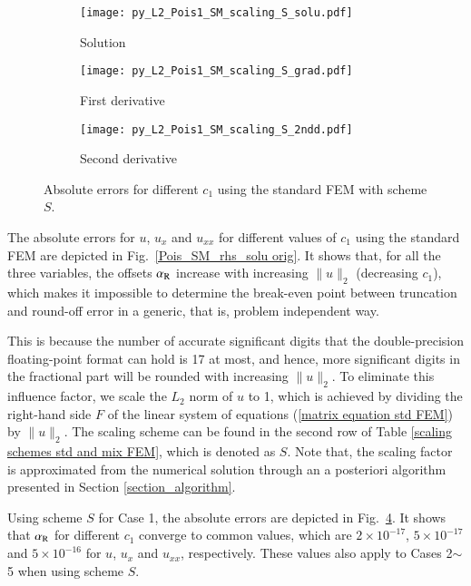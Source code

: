 \documentclass[review,3p]{elsarticle}
\begin{document}
\begin{figure}[!ht]
    \begin{subfigure}{5.5cm}
        \texttt{[image: py\_L2\_Pois1\_SM\_scaling\_S\_solu.pdf]}
        \caption{Solution}
        \label{py_L2_Pois1_SM_scaling_S_solu}
    \end{subfigure}
    \hspace{-0.2cm}
    \begin{subfigure}{5.5cm}
        \texttt{[image: py\_L2\_Pois1\_SM\_scaling\_S\_grad.pdf]}
        \caption{First derivative}
        \label{py_L2_Pois1_SM_scaling_S_grad}
    \end{subfigure}
    \hspace{-0.2cm}
    \begin{subfigure}{5.5cm}
        \texttt{[image: py\_L2\_Pois1\_SM\_scaling\_S\_2ndd.pdf]}
        \caption{Second derivative}
        \label{py_L2_Pois1_SM_scaling_S_2ndd}
    \end{subfigure}
\caption{Absolute errors for different $c_1$ using the standard FEM with scheme $S$.}    
\label{py_L2_Pois1_SM_scaling_S}
\end{figure}

The absolute errors for $u$, $u_{x}$ and $u_{xx}$ for different values of $c_1$ using the standard FEM are depicted in Fig.~\ref{Pois_SM_rhs_solu orig}. It shows that, for all the three variables, the offsets $\alpha_{\rm R}$ increase with increasing $\|u\|_2$ (decreasing $c_1$), which makes it impossible to determine the break-even point between truncation and round-off error in a generic, that is, problem independent way. 

This is because the number of accurate significant digits that the double-precision floating-point format can hold is 17 at most, and hence, more significant digits in the fractional part will be rounded with increasing $\|u\|_2$. To eliminate this influence factor, we scale the $L_2$ norm of $u$ to 1, which is achieved by dividing the right-hand side $F$ of the linear system of equations (\ref{matrix equation std FEM}) by $\|u\|_{2}$.
The scaling scheme can be found in the second row of Table \ref{scaling schemes std and mix FEM}, which is denoted as $S$.
Note that, the scaling factor is approximated from the numerical solution through an a posteriori algorithm presented in Section \ref{section_algorithm}.

Using scheme $S$ for Case 1, the absolute errors are depicted in Fig.~\ref{py_L2_Pois1_SM_scaling_S}. It shows that $\alpha_{\rm R}$ for different $c_1$ converge to common values, which are $2\times10^{-17}$, $5\times10^{-17}$ and $5\times10^{-16}$ for $u$, $u_{x}$ and $u_{xx}$, respectively. These values also apply to Cases 2$\sim$5 when using scheme $S$. 
\end{document}
